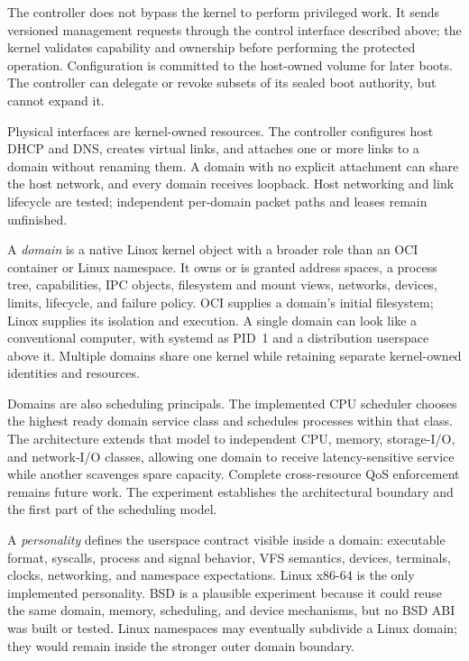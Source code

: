 \documentclass[11pt]{article}
\begin{document}
The controller does not bypass the kernel to perform privileged work. It sends
versioned management requests through the control interface described above;
the kernel validates capability and ownership before performing the protected
operation. Configuration is committed to the host-owned volume for later
boots. The controller can delegate or revoke subsets of its sealed boot
authority, but cannot expand it.

Physical interfaces are kernel-owned resources. The controller configures host
DHCP and DNS, creates virtual links, and attaches one or more links to a domain
without renaming them. A domain with no explicit attachment can share the host
network, and every domain receives loopback. Host networking and link lifecycle
are tested; independent per-domain packet paths and leases remain unfinished.

A \emph{domain} is a native Linox kernel object with a broader role than an OCI
container or Linux namespace. It owns or is granted address spaces, a process tree,
capabilities, IPC objects, filesystem and mount views, networks, devices,
limits, lifecycle, and failure policy. OCI supplies a domain's initial
filesystem; Linox supplies its isolation and execution. A single domain can
look like a conventional computer, with systemd as PID~1 and a distribution
userspace above it. Multiple domains share one kernel while retaining separate
kernel-owned identities and resources.

Domains are also scheduling principals. The implemented CPU scheduler chooses
the highest ready domain service class and schedules processes within that
class. The architecture extends that model to independent CPU, memory,
storage-I/O, and network-I/O classes, allowing one domain to receive
latency-sensitive service while another scavenges spare capacity. Complete
cross-resource QoS enforcement remains future work. The experiment establishes
the architectural boundary and the first part of the scheduling model.

A \emph{personality} defines the userspace contract visible inside a domain:
executable format, syscalls, process and signal behavior, VFS semantics,
devices, terminals, clocks, networking, and namespace expectations. Linux
x86-64 is the only implemented personality. BSD is a plausible experiment
because it could reuse the same domain, memory, scheduling, and device
mechanisms, but no BSD ABI was built or tested. Linux namespaces may eventually
subdivide a Linux domain; they would remain inside the stronger outer domain
boundary.
\end{document}

